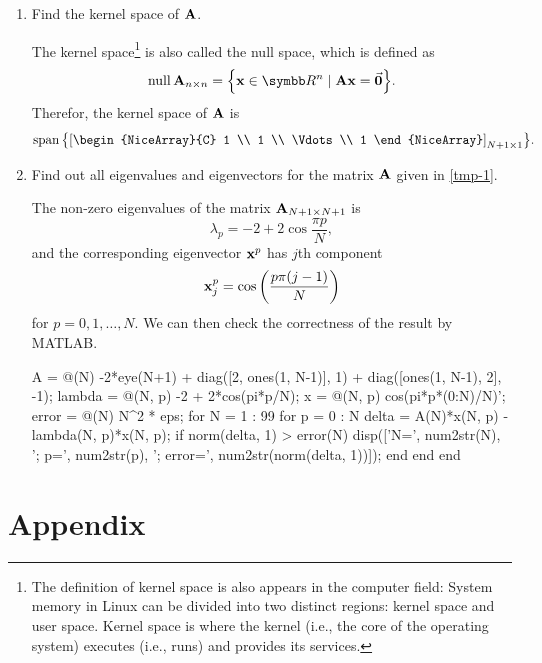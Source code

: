 \begin{enumerate}[label=(\alph*)]
\begin{solution}{}{}
        \end{solution}
    \item Find the kernel space of $\vb{A}$.
        \begin{solution}{}{}
            The kernel space\footnote{The definition of kernel space is also appears in the computer field: System memory in Linux can be divided into two distinct regions: kernel space and user space. Kernel space is where the kernel (i.e., the core of the operating system) executes (i.e., runs) and provides its services.} is also called the null space, which is defined as
            \[
                \nullspace{\mA_{n\times n}} = \qty{\vx\in\RR^n \mid \mA\vx=\va{0}}.
            \]
            Therefor, the kernel space of $\vb{A}$ is
            \[
                \spanof\qty{
                    \qty[\begin{NiceArray}{C}
                        1 \\ 1 \\ \Vdots \\ 1
                    \end{NiceArray}]_{N+1\times 1}
                }.
            \]
        \end{solution}
    \item Find out all eigenvalues and eigenvectors for the matrix $\vb{A}$ given in \ref{tmp-1}.
        \begin{solution}{}{}
            The non-zero eigenvalues of the matrix $\vb{A}_{N+1\times N+1}$ is
            \[
                \lambda_p = -2 + 2\cos\frac{\pi p}{N},
            \]
            and the corresponding eigenvector $\vb{x}^p$ has $j$th component
            \[
                \vb{x}^p_j = \cos\qty(\frac{p\pi(j-1)}{N})
            \]
            for $p=0,1,\ldots,N$. We can then check the correctness of the result by MATLAB.
            \begin{matlabcode}{}
A = @(N) -2*eye(N+1) + diag([2, ones(1, N-1)], 1) + diag([ones(1, N-1), 2], -1);
lambda = @(N, p) -2 + 2*cos(pi*p/N);
x = @(N, p) cos(pi*p*(0:N)/N)';
error = @(N) N^2 * eps;
for N = 1 : 99
    for p = 0 : N
        delta = A(N)*x(N, p) - lambda(N, p)*x(N, p);
        if norm(delta, 1) > error(N)
            disp(['N=', num2str(N), '; p=', num2str(p), '; error=', num2str(norm(delta, 1))]);
        end
    end
end
            \end{matlabcode}
        \end{solution}
\end{enumerate}



\clearpage
\section{Appendix}\label{S:appendix-1}
\begin{appendices}
\end{appendices}
